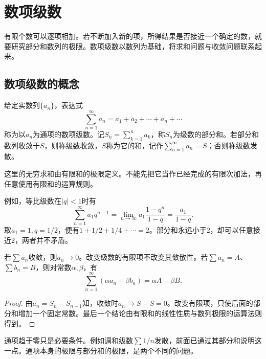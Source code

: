 \newpage
\section{数项级数}
\label{sec:analysis-series}

有限个数可以逐项相加。若不断加入新的项，所得结果是否接近一个确定的数，就要研究部分和数列的极限。数项级数以数列为基础，将求和问题与收敛问题联系起来。

\subsection{数项级数的概念}

\begin{definition}
给定实数列\(\{a_n\}\)，表达式
\begin{equation*}
 \sum_{n=1}^{\infty}a_n=a_1+a_2+\cdots+a_n+\cdots
\end{equation*}
称为以\(a_n\)为通项的{\heiti{}数项级数}。记\(S_n=\sum_{k=1}^n a_k\)，称\(S_n\)为级数的部分和。若部分和数列收敛于\(S\)，则称级数{\heiti{}收敛}，\(S\)称为它的和，记作\(\sum_{n=1}^{\infty}a_n=S\)；否则称级数发散。
\end{definition}

这里的无穷求和由有限和的极限定义。不能先把它当作已经完成的有限次加法，再任意使用有限和的运算规则。

例如，等比级数在\(|q|<1\)时有
\begin{equation}\label{eq:analysis-geometric-series}
 \sum_{n=1}^{\infty}a_1q^{n-1}
 =\lim_{n\to\infty}a_1\frac{1-q^n}{1-q}
 =\frac{a_1}{1-q}.
\end{equation}
取\(a_1=1,q=1/2\)，便有\(1+1/2+1/4+\cdots=2\)。部分和永远小于\(2\)，却可以任意接近\(2\)，两者并不矛盾。

\begin{proposition}
若\(\sum a_n\)收敛，则\(a_n\to0\)。改变级数的有限项不改变其敛散性。若\(\sum a_n=A\)、\(\sum b_n=B\)，则对常数\(\alpha,\beta\)，有
\begin{equation*}
 \sum_{n=1}^{\infty}(\alpha a_n+\beta b_n)=\alpha A+\beta B.
\end{equation*}
\end{proposition}

\begin{proof}
由\(a_n=S_n-S_{n-1}\)知，收敛时\(a_n\to S-S=0\)。改变有限项，只使后面的部分和增加一个固定常数。最后一个结论由有限和的线性性质与数列极限的运算法则得到。
\end{proof}

通项趋于零只是必要条件。例如调和级数\(\sum 1/n\)发散，前面已通过其部分和说明这一点。通项本身的极限与部分和的极限，是两个不同的问题。

